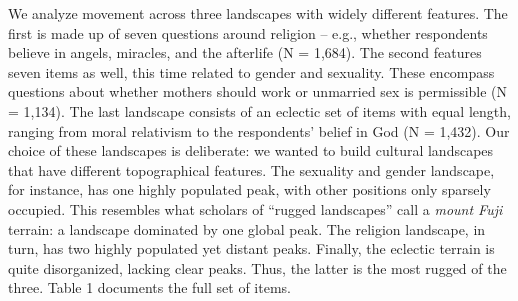 \documentclass[
  11pt,
]{article}
\begin{document}
We analyze movement across three landscapes with widely different
features. The first is made up of seven questions around religion --
e.g., whether respondents believe in angels, miracles, and the afterlife
(N = 1,684). The second features seven items as well, this time related
to gender and sexuality. These encompass questions about whether mothers
should work or unmarried sex is permissible (N = 1,134). The last
landscape consists of an eclectic set of items with equal length,
ranging from moral relativism to the respondents' belief in God (N =
1,432). Our choice of these landscapes is deliberate: we wanted to build
cultural landscapes that have different topographical features. The
sexuality and gender landscape, for instance, has one highly populated
peak, with other positions only sparsely occupied. This resembles what
scholars of ``rugged landscapes'' call a \emph{mount Fuji} terrain: a
landscape dominated by one global peak. The religion landscape, in turn,
has two highly populated yet distant peaks. Finally, the eclectic
terrain is quite disorganized, lacking clear peaks. Thus, the latter is
the most rugged of the three. Table 1 documents the full set of items.
\end{document}
